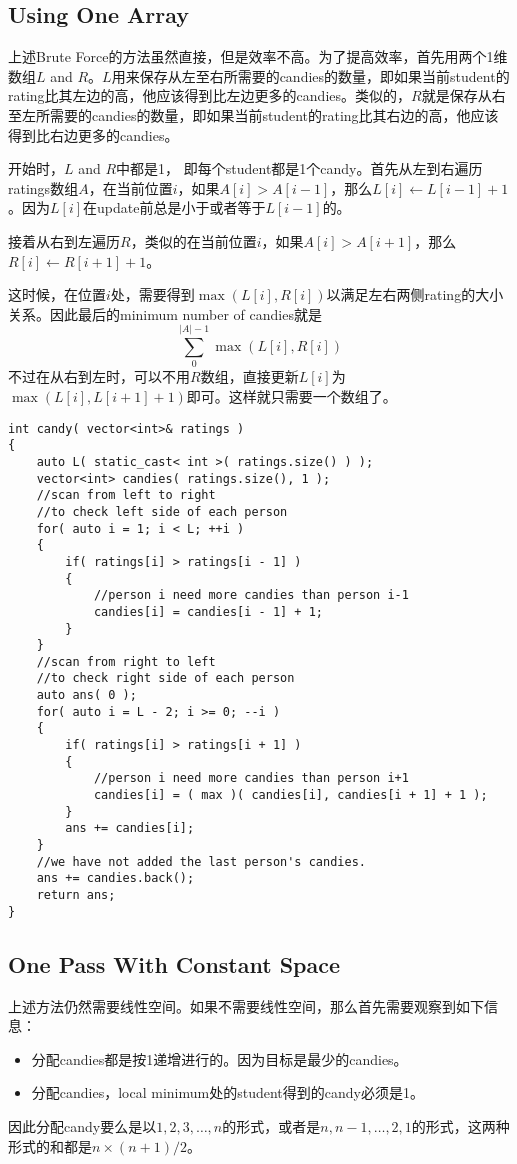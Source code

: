 \subsection{Using One Array}
上述Brute Force的方法虽然直接，但是效率不高。为了提高效率，首先用两个1维数组$L$ and $R$。$L$用来保存从左至右所需要的candies的数量，即如果当前student的rating比其左边的高，他应该得到比左边更多的candies。类似的，$R$就是保存从右至左所需要的candies的数量，即如果当前student的rating比其右边的高，他应该得到比右边更多的candies。
\par
开始时，$L$ and $R$中都是1， 即每个student都是1个candy。首先从左到右遍历ratings数组$A$，在当前位置$i$，如果$A[i]>A[i-1]$，那么$L[i]\gets L[i-1]+1$。因为$L[i]$在update前总是小于或者等于$L[i-1]$的。
\par
接着从右到左遍历$R$，类似的在当前位置$i$，如果$A[i]>A[i+1]$，那么$R[i]\gets R[i+1]+1$。
\par
这时候，在位置$i$处，需要得到$\max(L[i],R[i])$以满足左右两侧rating的大小关系。因此最后的minimum number of candies就是
\[
\sum_{0}^{|A|-1}\max(L[i], R[i])
\]
不过在从右到左时，可以不用$R$数组，直接更新$L[i]$为$\max(L[i], L[i+1]+1)$即可。这样就只需要一个数组了。

\setcounter{lstlisting}{0}
\begin{lstlisting}[style=customc, caption={Bidirectional Scanning}]
int candy( vector<int>& ratings )
{
    auto L( static_cast< int >( ratings.size() ) );
    vector<int> candies( ratings.size(), 1 );
    //scan from left to right
    //to check left side of each person
    for( auto i = 1; i < L; ++i )
    {
        if( ratings[i] > ratings[i - 1] )
        {
            //person i need more candies than person i-1
            candies[i] = candies[i - 1] + 1;
        }
    }
    //scan from right to left
    //to check right side of each person
    auto ans( 0 );
    for( auto i = L - 2; i >= 0; --i )
    {
        if( ratings[i] > ratings[i + 1] )
        {
            //person i need more candies than person i+1
            candies[i] = ( max )( candies[i], candies[i + 1] + 1 );
        }
        ans += candies[i];
    }
    //we have not added the last person's candies.
    ans += candies.back();
    return ans;
}
\end{lstlisting}

\subsection{One Pass With Constant Space}
上述方法仍然需要线性空间。如果不需要线性空间，那么首先需要观察到如下信息：
\begin{itemize}
\item 分配candies都是按1递增进行的。因为目标是最少的candies。
\item 分配candies，local minimum处的student得到的candy必须是1。
\end{itemize}
因此分配candy要么是以$1,2,3,\ldots,n$的形式，或者是$n, n-1, \ldots, 2, 1$的形式，这两种形式的和都是$n\times(n+1)/2$。

